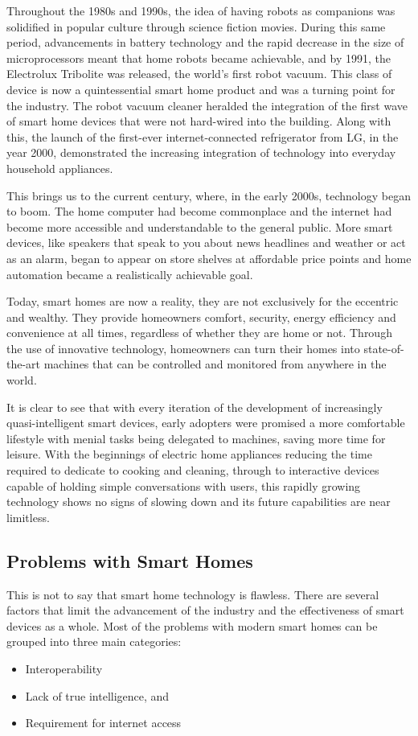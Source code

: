 Throughout the 1980s and 1990s, the idea of having robots as companions was solidified in popular culture through science fiction movies.
During this same period, advancements in battery technology and the rapid decrease in the size of microprocessors meant that home robots became achievable, and by 1991, the Electrolux Tribolite was released, the world's first robot vacuum.
This class of device is now a quintessential smart home product and was a turning point for the industry.
The robot vacuum cleaner heralded the integration of the first wave of smart home devices that were not hard-wired into the building.
Along with this, the launch of the first-ever internet-connected refrigerator from LG, in the year 2000, demonstrated the increasing integration of technology into everyday household appliances.

This brings us to the current century, where, in the early 2000s, technology began to boom.
The home computer had become commonplace and the internet had become more accessible and understandable to the general public.
More smart devices, like speakers that speak to you about news headlines and weather or act as an alarm, began to appear on store shelves at affordable price points and home automation became a realistically achievable goal.

Today, smart homes are now a reality, they are not exclusively for the eccentric and wealthy.
They provide homeowners comfort, security, energy efficiency and convenience at all times, regardless of whether they are home or not.
Through the use of innovative technology, homeowners can turn their homes into state-of-the-art machines that can be controlled and monitored from anywhere in the world.

It is clear to see that with every iteration of the development of increasingly quasi-intelligent smart devices, early adopters were promised a more comfortable lifestyle with menial tasks being delegated to machines, saving more time for leisure.
With the beginnings of electric home appliances reducing the time required to dedicate to cooking and cleaning, through to interactive devices capable of holding simple conversations with users, this rapidly growing technology shows no signs of slowing down and its future capabilities are near limitless.

\subsection{Problems with Smart Homes}
This is not to say that smart home technology is flawless.
There are several factors that limit the advancement of the industry and the effectiveness of smart devices as a whole.
Most of the problems with modern smart homes can be grouped into three main categories:
\begin{itemize}
    \item Interoperability
    \item Lack of true intelligence, and
    \item Requirement for internet access
\end{itemize}

